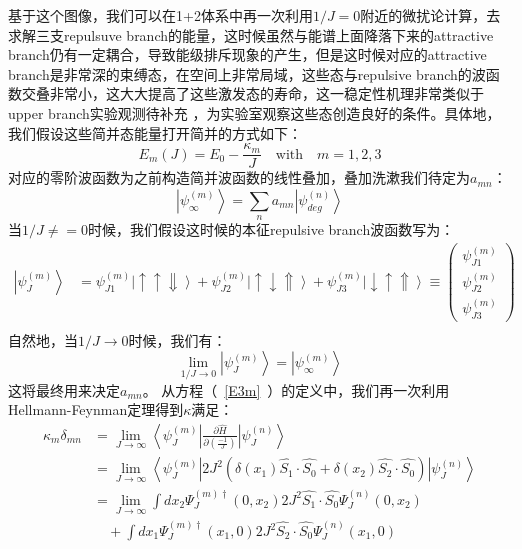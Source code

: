 基于这个图像，我们可以在1+2体系中再一次利用$1/J=0$附近的微扰论计算，去求解三支repulsuve branch的能量，这时候虽然与能谱上面降落下来的attractive branch仍有一定耦合，导致能级排斥现象的产生，但是这时候对应的attractive branch是非常深的束缚态，在空间上非常局域，这些态与repulsive branch的波函数交叠非常小，这大大提高了这些激发态的寿命，这一稳定性机理非常类似于{\color{red} upper branch实验观测待补充 }，为实验室观察这些态创造良好的条件。具体地，我们假设这些简并态能量打开简并的方式如下：
\begin{equation}
    E_m(J) = E_0 - \frac{\kappa_m }{J} \quad \text{with}  \quad m =1,2,3  \label{E3m}
\end{equation}
对应的零阶波函数为之前构造简并波函数的线性叠加，叠加洗漱我们待定为$a_{mn}$：
    \begin{equation}
        \left|\psi^{(m)}_{\infty} \right> = \sum_n a_{mn} \left|\psi^{(n)}_{deg}\right>
    \end{equation}
当$1/J\neq=0$时候，我们假设这时候的本征repulsive branch波函数写为：
    \begin{equation}
        \begin{split}
            \left|\psi^{(m)}_J\right> &=  \psi^{(m)}_{J1}\left|\uparrow \uparrow \Downarrow \right> + \psi^{(m)}_{J2} \left|\uparrow \downarrow \Uparrow \right>  +\psi^{(m)}_{J3} \left|\downarrow \uparrow \Uparrow \right> \equiv\left(
            \begin{array}{c}
                \psi_{J1}^{(m)} \\
                \psi_{J2}^{(m)}\\
                \psi_{J3}^{(m)}
            \end{array}
            \right)\\
        \end{split} \label{eq2}
    \end{equation} 
自然地，当$1/J\to0$时候，我们有：
\begin{equation}
    \lim_{1/J\to0} \left|\psi^{(m)}_J\right>  = \left|\psi^{(m)}_{\infty} \right>
\end{equation}
这将最终用来决定$a_{mn}$。
从方程（~\ref{E3m}~）的定义中，我们再一次利用Hellmann-Feynman定理得到$\kappa$满足：
    \begin{equation}
        \begin{split}
            \kappa_m \delta_{mn} &= \lim_{J\to \infty} \left<\psi^{(m)}_J\right| \frac{\partial\hat{H}}{\partial(\frac{-1}{J})} \left|\psi^{(n)}_{J}\right>\\
                &= \lim_{J\to \infty} \left<\psi^{(m)}_J\right| 2J^2(\delta(x_1)\hat{S_1}\cdot \hat{S_0}+\delta(x_2)\hat{S_2}\cdot \hat{S_0}) \left|\psi^{(n)}_{J}\right>\\
                &= \lim_{J\to \infty} \int  dx_2 \Psi^{(m)\dagger}_J(0,x_2) 2J^2 \hat{S_1}\cdot \hat{S_0} \Psi^{(n)}_J(0,x_2) \\
                &\quad + \int dx_1 \Psi^{(m)\dagger}_J(x_1,0) 2J^2 \hat{S_2}\cdot \hat{S_0} \Psi^{(n)}_J(x_1,0) \\
        \end{split} \label{kappam}
    \end{equation}
